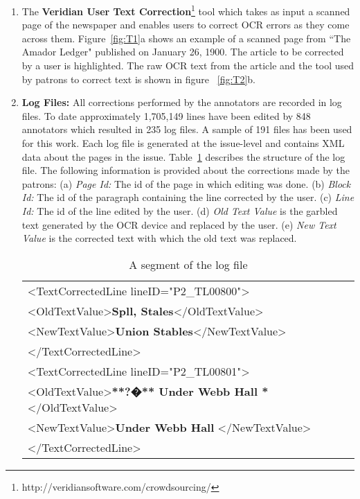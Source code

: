 \documentclass{sig-alternate}
\begin{document}
\begin{enumerate}

\item The \textbf{Veridian User Text Correction}\footnote{http://veridiansoftware.com/crowdsourcing/} tool which takes as input a scanned page of the newspaper and enables users to correct OCR errors as they come across them.
Figure~\ref{fig:T1}a shows an example of a scanned page from ``The Amador Ledger" published on January 26, 1900. The article to be corrected by a user is highlighted. The raw OCR text from the article and the tool used by patrons to correct text is shown in figure ~\ref{fig:T2}b.


\item \textbf{Log Files: }All corrections performed by the annotators are recorded in log files. To date approximately 1,705,149 lines have been edited by 848 annotators which resulted in 235 log files. A sample of 191 files has been used for this work. Each log file is generated at the issue-level and contains XML data about the pages in the issue. Table~\ref{table:logfile} describes the structure of the log file. The following information is provided about the corrections made by the patrons:
(a) \textit{Page Id: } The id of the page in which editing was done.
(b) \textit{Block Id: } The id of the paragraph containing the line corrected by the user.
(c) \textit{Line Id: }The id of the line edited by the user.
(d) \textit{Old Text Value} is the garbled text generated by the OCR device and replaced by the user.
(e) \textit{New Text Value} is the corrected text with which the old text was replaced.

\begin{table}[h]
\begin{center}
\begin{tabular}{l}
\textless TextCorrectedLine lineID="P2\_TL00800"\textgreater \\
\textless OldTextValue\textgreater \textbf{Spll, Stales}\textless /OldTextValue\textgreater \\
\textless NewTextValue\textgreater \textbf{Union Stables}\textless /NewTextValue\textgreater \\
\textless /TextCorrectedLine\textgreater \\
\textless TextCorrectedLine lineID="P2\_TL00801"\textgreater \\
\textless OldTextValue\textgreater \textbf{**?�** Under Webb Hall *}\textless/OldTextValue\textgreater \\
\textless NewTextValue\textgreater \textbf{Under Webb Hall} \textless/NewTextValue\textgreater \\
\textless /TextCorrectedLine\textgreater \\
\end{tabular}
\end{center}
\caption{A segment of the log file}
\label{table:logfile}
\end{table}


\end{enumerate}
\end{document}

